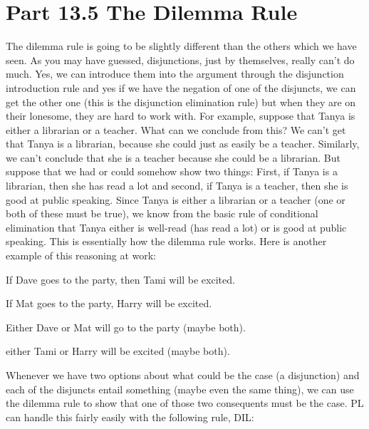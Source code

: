 \section{Part 13.5 The Dilemma Rule}
The dilemma rule is going to be slightly different than the others which we have seen. As you may have guessed, disjunctions, just by themselves, really can't do much. Yes, we can introduce them into the argument through the disjunction introduction rule and yes if we have the negation of one of the disjuncts, we can get the other one (this is the disjunction elimination rule) but when they are on their lonesome, they are hard to work with. For example, suppose that Tanya is either a librarian or a teacher. What can we conclude from this? We can't get that Tanya is a librarian, because she could just as easily be a teacher. Similarly, we can't conclude that she is a teacher because she could be a librarian. But suppose that we had or could somehow show two things: First, if Tanya is a librarian, then she has read a lot and second, if Tanya is a teacher, then she is good at public speaking. Since Tanya is either a librarian or a teacher (one or both of these must be true), we know from the basic rule of conditional elimination that Tanya either is well-read (has read a lot) or is good at public speaking. This is essentially how the dilemma rule works. Here is another example of this reasoning at work:

\begin{earg}
\item[]If Dave goes to the party, then Tami will be excited.
\item[]If Mat goes to the party, Harry will be excited.
\item[]Either Dave or Mat will go to the party (maybe both).
\item[\therefore] either Tami or Harry will be excited (maybe both).
\end{earg}

Whenever we have two options about what could be the case (a disjunction) and each of the disjuncts entail something (maybe even the same thing), we can use the dilemma rule to show that one of those two consequents must be the case. PL can handle this fairly easily with the following rule, DIL:

